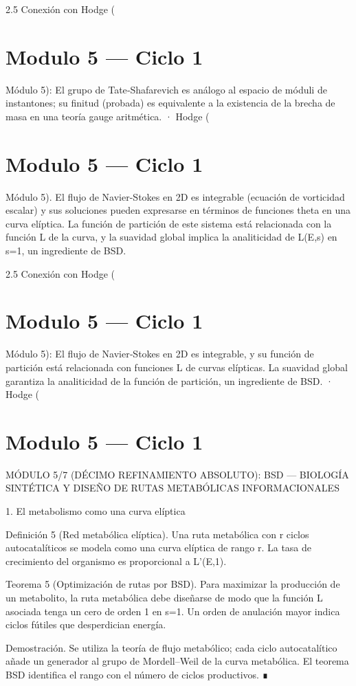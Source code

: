 \documentclass[12pt,twoside]{book}
\begin{document}
2.5 Conexión con Hodge (

\chapter{Modulo 5 — Ciclo 1}
Módulo 5): El grupo de Tate‑Shafarevich es análogo al espacio de móduli de instantones; su finitud (probada) es equivalente a la existencia de la brecha de masa en una teoría gauge aritmética.
· Hodge (

\chapter{Modulo 5 — Ciclo 1}
Módulo 5).
El flujo de Navier-Stokes en 2D es integrable (ecuación de vorticidad escalar) y sus soluciones pueden expresarse en términos de funciones theta en una curva elíptica. La función de partición de este sistema está relacionada con la función L de la curva, y la suavidad global implica la analiticidad de L(E,s) en s=1, un ingrediente de BSD.

2.5 Conexión con Hodge (

\chapter{Modulo 5 — Ciclo 1}
Módulo 5): El flujo de Navier‑Stokes en 2D es integrable, y su función de partición está relacionada con funciones L de curvas elípticas. La suavidad global garantiza la analiticidad de la función de partición, un ingrediente de BSD.
· Hodge (

\chapter{Modulo 5 — Ciclo 1}
MÓDULO 5/7 (DÉCIMO REFINAMIENTO ABSOLUTO): BSD — BIOLOGÍA SINTÉTICA Y DISEÑO DE RUTAS METABÓLICAS INFORMACIONALES

1. El metabolismo como una curva elíptica

Definición 5 (Red metabólica elíptica). Una ruta metabólica con r ciclos autocatalíticos se modela como una curva elíptica de rango r. La tasa de crecimiento del organismo es proporcional a L'(E,1).

Teorema 5 (Optimización de rutas por BSD). Para maximizar la producción de un metabolito, la ruta metabólica debe diseñarse de modo que la función L asociada tenga un cero de orden 1 en s=1. Un orden de anulación mayor indica ciclos fútiles que desperdician energía.

Demostración. Se utiliza la teoría de flujo metabólico; cada ciclo autocatalítico añade un generador al grupo de Mordell–Weil de la curva metabólica. El teorema BSD identifica el rango con el número de ciclos productivos. ∎
\end{document}
